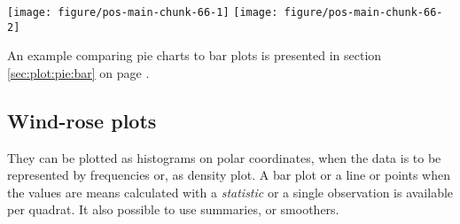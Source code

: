 \documentclass[krantz2]{krantz}\usepackage{knitr}%
\begin{document}
\begin{knitrout}\footnotesize
{}\color{fgcolor}\begin{kframe}
\begin{alltt}
\hlstd{(}  \hlstd{(} \hlstd{=}   \hlstd{=}  \hlopt{+}
  \hlstd{(} \hlstd{=} \hlstd{)} \hlopt{+}
  \hlstd{()} \hlopt{+}
  \hlstd{(} \hlstd{=} \hlstd{)} \hlopt{+}
  \hlstd{(} \hlstd{=} \hlstd{,}  \hlstd{=} \hlstd{)} \hlopt{+}
  \hlstd{()}

\hlstd{(}  \hlstd{(} \hlstd{=} \hlstd{(}\hlstd{),}  \hlstd{=}  \hlopt{+}
  \hlstd{(} \hlstd{=} \hlstd{,}  \hlstd{=} \hlstd{)} \hlopt{+}
  \hlstd{(} \hlstd{=} \hlstd{)} \hlopt{+}
  \hlstd{()} \hlopt{+}
  \hlstd{(} \hlstd{=} \hlstd{)} \hlopt{+}
  \hlstd{(} \hlstd{=} \hlstd{,}  \hlstd{=} \hlstd{)} \hlopt{+}
  \hlstd{()}
\end{alltt}
\end{kframe}

{\centering \texttt{[image: figure/pos-main-chunk-66-1]} 
\texttt{[image: figure/pos-main-chunk-66-2]} 

}



\end{knitrout}

An example comparing pie charts to bar plots is presented in section \ref{sec:plot:pie:bar} on page \pageref{sec:plot:pie:bar}.

\subsection{Wind-rose plots}
They can be plotted as histograms on polar coordinates, when the data is to be represented by frequencies or, as density plot. A bar plot or a line or points when the values are means calculated with a \emph{statistic} or a single observation is available per quadrat. It also possible to use summaries, or smoothers.
\end{document}
